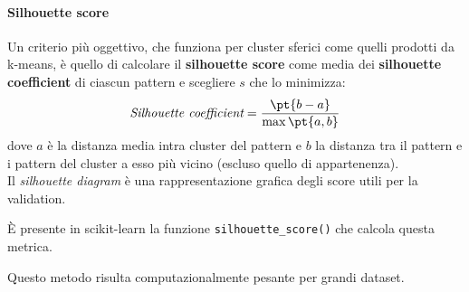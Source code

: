 \paragraph{Silhouette score}\label{par:silhouette_score} %
Un criterio più oggettivo, che funziona per cluster sferici come quelli prodotti da k-means, è quello di calcolare il \textbf{silhouette score} come media dei \textbf{silhouette coefficient} di ciascun pattern e scegliere $s$ che lo minimizza:
\[
    \textit{Silhouette coefficient} = \frac{\pt{b-a}}{\max{\pt{a, b}}}
\]
dove $a$ è la distanza media intra cluster del pattern e $b$ la distanza tra il pattern e i pattern del cluster a esso più vicino (escluso quello di appartenenza).
\\
Il \textit{silhouette diagram} è una rappresentazione grafica degli score utili per la validation.
\begin{note}
    È presente in scikit-learn la funzione \texttt{silhouette\_score()} che calcola questa metrica.
\end{note}
\begin{warning}
    Questo metodo risulta computazionalmente pesante per grandi dataset.
\end{warning}
%
